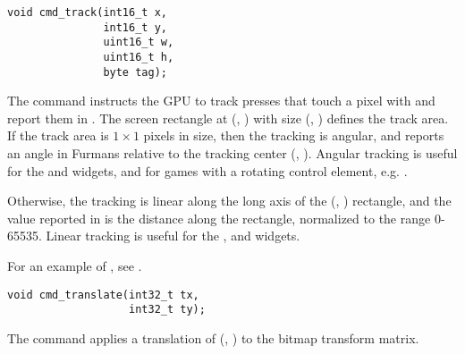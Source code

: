 \threed


\begin{framed}
\begin{verbatim}
void cmd_track(int16_t x,
               int16_t y,
               uint16_t w,
               uint16_t h,
               byte tag);
\end{verbatim}
\end{framed}

The  command
instructs the GPU to track presses
that touch a pixel with 
and report them in .
The screen rectangle at
(, ) with size
(, ) defines the track area.
If the track area is $1 \times 1$ pixels in size, then the tracking is angular,
and  reports an angle in Furmans relative to the tracking center
(, ).
Angular tracking is useful for the
 and  widgets, and for games with a rotating control element, e.g. .

Otherwise, the tracking is linear along the long axis of the (, ) rectangle, and the value reported in 
 is the distance along the rectangle, normalized to the range 0-65535.
Linear tracking is useful for the
,
and
 widgets.

For an example of , see .


\begin{framed}
\begin{verbatim}
void cmd_translate(int32_t tx,
                   int32_t ty);
\end{verbatim}
\end{framed}

The  command
applies a translation of (, )
to the bitmap transform matrix.
\fsixteen


